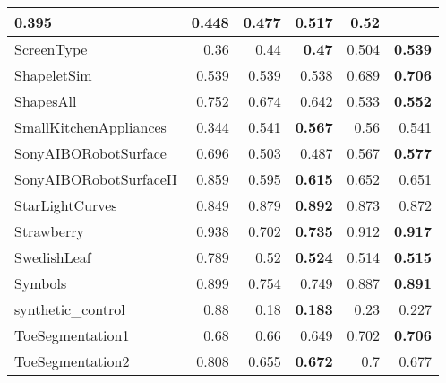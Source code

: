 \begin{longtable}[c]{|l||r||r|r||r|r|}
0.395 &
0.448 &
\cellcolor[rgb]{ .973,  .796,  .678} \textbf{0.477} &
0.517 &
\cellcolor[rgb]{ .973,  .796,  .678} \textbf{0.52}
\bigstrut\\
\hline
ScreenType &
0.36 &
0.44 &
\cellcolor[rgb]{ .973,  .796,  .678} \textbf{0.47} &
0.504 &
\cellcolor[rgb]{ .973,  .796,  .678} \textbf{0.539}
\bigstrut\\
\hline
\rowcolor[rgb]{ .851,  .851,  .851} ShapeletSim &
0.539 &
0.539 &
0.538 &
0.689 &
\cellcolor[rgb]{ .973,  .796,  .678} \textbf{0.706}
\bigstrut\\
\hline
ShapesAll &
0.752 &
0.674 &
0.642 &
0.533 &
\cellcolor[rgb]{ .973,  .796,  .678} \textbf{0.552}
\bigstrut\\
\hline
\rowcolor[rgb]{ .851,  .851,  .851} SmallKitchenAppliances &
0.344 &
0.541 &
\cellcolor[rgb]{ .973,  .796,  .678} \textbf{0.567} &
0.56 &
0.541
\bigstrut\\
\hline
SonyAIBORobotSurface &
0.696 &
0.503 &
0.487 &
0.567 &
\cellcolor[rgb]{ .973,  .796,  .678} \textbf{0.577}
\bigstrut\\
\hline
\rowcolor[rgb]{ .851,  .851,  .851} SonyAIBORobotSurfaceII &
0.859 &
0.595 &
\cellcolor[rgb]{ .973,  .796,  .678} \textbf{0.615} &
0.652 &
0.651
\bigstrut\\
\hline
StarLightCurves &
0.849 &
0.879 &
\cellcolor[rgb]{ .973,  .796,  .678} \textbf{0.892} &
0.873 &
0.872
\bigstrut\\
\hline
\rowcolor[rgb]{ .851,  .851,  .851} Strawberry &
0.938 &
0.702 &
\cellcolor[rgb]{ .973,  .796,  .678} \textbf{0.735} &
0.912 &
\cellcolor[rgb]{ .973,  .796,  .678} \textbf{0.917}
\bigstrut\\
\hline
SwedishLeaf &
0.789 &
0.52 &
\cellcolor[rgb]{ .973,  .796,  .678} \textbf{0.524} &
0.514 &
\cellcolor[rgb]{ .973,  .796,  .678} \textbf{0.515}
\bigstrut\\
\hline
\rowcolor[rgb]{ .851,  .851,  .851} Symbols &
0.899 &
0.754 &
0.749 &
0.887 &
\cellcolor[rgb]{ .973,  .796,  .678} \textbf{0.891}
\bigstrut\\
\hline
synthetic\_control &
0.88 &
0.18 &
\cellcolor[rgb]{ .973,  .796,  .678} \textbf{0.183} &
0.23 &
0.227
\bigstrut\\
\hline
\rowcolor[rgb]{ .851,  .851,  .851} ToeSegmentation1 &
0.68 &
0.66 &
0.649 &
0.702 &
\cellcolor[rgb]{ .973,  .796,  .678} \textbf{0.706}
\bigstrut\\
\hline
ToeSegmentation2 &
0.808 &
0.655 &
\cellcolor[rgb]{ .973,  .796,  .678} \textbf{0.672} &
0.7 &
0.677
\bigstrut\\

\end{longtable}
